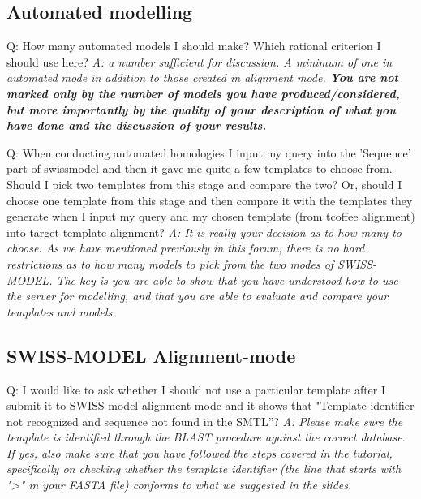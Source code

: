 \documentclass[10pt,a4paper]{article}
\begin{document}
\subsection{Automated modelling}
Q: How many automated models I should make? Which rational criterion I should use here? \newline
\textit{A: a number sufficient for discussion. A minimum of one in automated mode in addition to those created in alignment mode. \textbf{You are not marked only by the number of models you have produced/considered, but more importantly by the quality of your description of what you have done and the discussion of your results.}} \newline

Q: When conducting automated homologies I input my query into the 'Sequence' part of swissmodel and then it gave me quite a few templates to choose from. Should I pick two templates from this stage and compare the two? Or, should I choose one template from this stage and then compare it with the templates they generate when I input my query and my chosen template (from tcoffee alignment) into target-template alignment? \newline 
\textit{A: It is really your decision as to how many to choose. As we have mentioned previously in this forum, there is no hard restrictions as to how many models to pick from the two modes of SWISS-MODEL. The key is you are able to show that you have understood how to use the server for modelling, and that you are able to evaluate and compare your templates and models.} \newline

\subsection{SWISS-MODEL Alignment-mode}
Q: I would like to ask whether I should not use a particular template after I submit it to SWISS model alignment mode and it shows that "Template identifier not recognized and sequence not found in the SMTL”?
\textit{A: Please make sure the template is identified through the BLAST procedure against the correct database. If yes, also make sure that you have followed the steps covered in the tutorial, specifically on checking whether the template identifier (the line that starts with ">" in your FASTA file) conforms to what we suggested in the slides. } \newline
\end{document}
